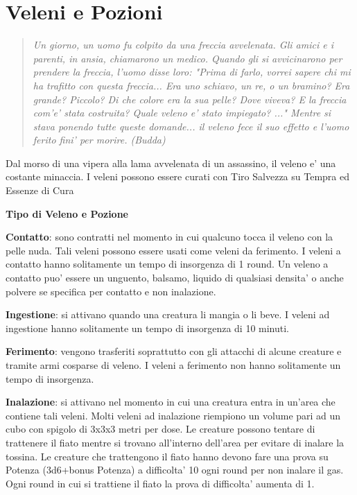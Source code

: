 \documentclass[a4paper,11pt,twoside,openany]{book}
\begin{document}
\pagebreak


\section{Veleni e Pozioni}

\label{veleni-e-pozioni}


\begin{quote}\textit{
Un giorno, un uomo fu colpito da una freccia avvelenata. Gli amici e i parenti, in ansia, chiamarono un medico. Quando gli si avvicinarono per prendere la freccia, l'uomo disse loro: "Prima di farlo, vorrei sapere chi mi ha trafitto con questa freccia... Era uno schiavo, un re, o un bramino? Era grande? Piccolo? Di che colore era la sua pelle? Dove viveva? E la freccia com'e' stata costruita? Quale veleno e' stato impiegato? ..." Mentre si stava ponendo tutte queste domande... il veleno fece il suo effetto e l'uomo ferito fini' per morire. (Budda)
}\end{quote}


Dal morso di una vipera alla lama avvelenata di un assassino, il veleno e' una costante minaccia. I veleni possono essere curati con Tiro Salvezza su Tempra ed Essenze di Cura

\bigskip

\textbf{Tipo di Veleno e Pozione}

\textbf{Contatto}: sono contratti nel momento in cui qualcuno tocca il veleno con la pelle nuda. Tali veleni possono essere usati come veleni da ferimento. I veleni a contatto hanno solitamente un tempo di insorgenza di 1 round. Un veleno a contatto puo' essere un unguento, balsamo, liquido di qualsiasi densita' o anche polvere se specifica per contatto e non inalazione.

\textbf{Ingestione}: si attivano quando una creatura li mangia o li beve. I veleni ad ingestione hanno solitamente un tempo di insorgenza di 10 minuti.

\textbf{Ferimento}: vengono trasferiti soprattutto con gli attacchi di alcune creature e tramite armi cosparse di veleno. I veleni a ferimento non hanno solitamente un tempo di insorgenza. 

\textbf{Inalazione}: si attivano nel momento in cui una creatura entra in un'area che contiene tali veleni. Molti veleni ad inalazione riempiono un volume pari ad un cubo con spigolo di 3x3x3 metri per dose. Le creature possono tentare di trattenere il fiato mentre si trovano all'interno dell'area per evitare di inalare la tossina. Le creature che trattengono il fiato hanno devono fare una prova su Potenza (3d6+bonus Potenza) a difficolta' 10 ogni round per non inalare il gas. Ogni round in cui si trattiene il fiato la prova di difficolta' aumenta di 1.
\end{document}
